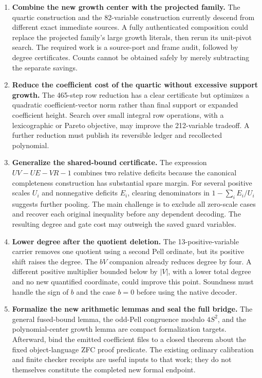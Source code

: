 \documentclass[10pt,letterpaper]{article}
\theoremstyle{remark}\newtheorem{remark}[theorem]{Remark}
\begin{document}
\begin{enumerate}
\item \textbf{Combine the new growth center with the projected family.}
The quartic construction and the 82-variable construction currently descend
from different exact immediate sources. A fully authenticated composition
could replace the projected family's large growth literals, then rerun its
unit-pivot search. The required work is a source-port and frame audit,
followed by degree certificates. Counts cannot be obtained safely by merely
subtracting the separate savings.

\item \textbf{Reduce the coefficient cost of the quartic without excessive
support growth.} The 465-step row reduction has a clear certificate but
optimizes a quadratic coefficient-vector norm rather than final support
or expanded coefficient height. Search over small integral row operations,
with a lexicographic or Pareto objective, may improve the 212-variable
tradeoff. A further reduction must publish its reversible ledger and
recollected polynomial.

\item \textbf{Generalize the shared-bound certificate.}
The expression $UV-UE-VR-1$ combines two relative deficits because the
canonical completeness construction has substantial spare margin.
For several positive scales $U_i$ and nonnegative deficits $E_i$, clearing
denominators in $1-\sum_i E_i/U_i$ suggests further pooling. The main
challenge is to exclude all zero-scale cases and recover each original
inequality before any dependent decoding. The resulting degree and gate
cost may outweigh the saved guard variables.

\item \textbf{Lower degree after the quotient deletion.}
The 13-positive-variable carrier removes one quotient using a second Pell
ordinate, but its positive shift raises the degree. The $bV$ companion
already reduces degree by four. A different positive multiplier bounded
below by $|V|$, with a lower total degree and no new quantified coordinate,
could improve this point. Soundness must handle the sign of $b$ and the
case $b=0$ before using the native decoder.

\item \textbf{Formalize the new arithmetic lemmas and seal the full bridge.}
The general fused-bound lemma, the odd-Pell congruence modulo $4S^2$, and
the polynomial-center growth lemma are compact formalization targets.
Afterward, bind the emitted coefficient files to a closed theorem about
the fixed object-language ZFC proof predicate. The existing ordinary
calibration and finite checker receipts are useful inputs to that work;
they do not themselves constitute the completed new formal endpoint.
\end{enumerate}
\end{document}
